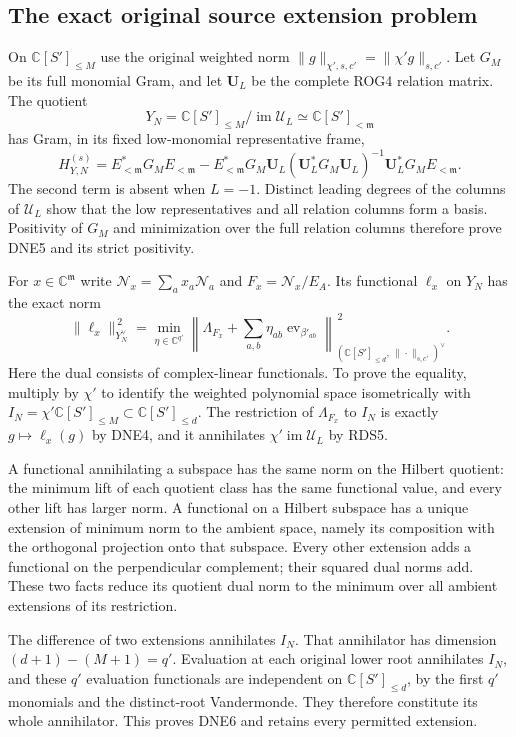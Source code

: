\documentclass[11pt,a4paper]{article}
\begin{document}
\subsection{The exact original source extension problem}

On $\mathbb C[S']_{\le M}$ use the original weighted norm
$\|g\|_{\chi',s,c'}=\|\chi'g\|_{s,c'}$. Let $G_M$ be its full
monomial Gram, and let $\mathbf U_L$ be the complete ROG4
relation matrix. The quotient
\[
 Y_N=\mathbb C[S']_{\le M}/\operatorname{im}\mathcal U_L
 \simeq\mathbb C[S']_{<\mathfrak m}
\]
has Gram, in its fixed low-monomial representative frame,
\[
 H_{Y,N}^{(s)}
 =E_{<\mathfrak m}^*G_ME_{<\mathfrak m}
 -E_{<\mathfrak m}^*G_M\mathbf U_L
  (\mathbf U_L^*G_M\mathbf U_L)^{-1}
             \mathbf U_L^*G_ME_{<\mathfrak m}.
 \tag{DNE5}
\]
The second term is absent when $L=-1$. Distinct leading
degrees of the columns of $\mathcal U_L$ show that the low
representatives and all relation columns form a basis.
Positivity of $G_M$ and minimization over the full relation
columns therefore prove DNE5 and its strict positivity.

For $x\in\mathbb C^{\mathfrak m}$ write
$\mathcal N_x=\sum_a x_a\mathcal N_a$ and
$F_x=\mathcal N_x/E_A$. Its functional $\ell_x$ on $Y_N$
has the exact norm
\[
 \|\ell_x\|_{Y_N^\vee}^{\,2}
 =\min_{\eta\in\mathbb C^{q'}}
   \left\|\Lambda_{F_x}
          +\sum_{a,b}\eta_{ab}\operatorname{ev}_{\beta'_{ab}}
   \right\|_{(\mathbb C[S']_{\le d},\,\|\cdot\|_{s,c'})^\vee}^{\,2}.
 \tag{DNE6}
\]
Here the dual consists of complex-linear functionals.
To prove the equality, multiply by $\chi'$ to identify the
weighted polynomial space isometrically with
$I_N=\chi'\mathbb C[S']_{\le M}\subset\mathbb C[S']_{\le d}$.
The restriction of $\Lambda_{F_x}$ to $I_N$ is exactly
$g\mapsto\ell_x(g)$ by DNE4, and it annihilates
$\chi'\operatorname{im}\mathcal U_L$ by RDS5.

A functional annihilating a subspace has the same norm on
the Hilbert quotient: the minimum lift of each quotient
class has the same functional value, and every other lift
has larger norm. A functional on a Hilbert subspace has a
unique extension of minimum norm to the ambient space,
namely its composition with the orthogonal projection onto
that subspace. Every other extension adds a functional on
the perpendicular complement; their squared dual norms add.
These two facts reduce its quotient dual norm to the
minimum over all ambient extensions of its restriction.

The difference of two extensions annihilates $I_N$.
That annihilator has dimension
$(d+1)-(M+1)=q'$. Evaluation at each original lower root
annihilates $I_N$, and these $q'$ evaluation functionals are
independent on $\mathbb C[S']_{\le d}$, by the first $q'$
monomials and the distinct-root Vandermonde. They therefore
constitute its whole annihilator. This proves DNE6 and
retains every permitted extension.
\end{document}
